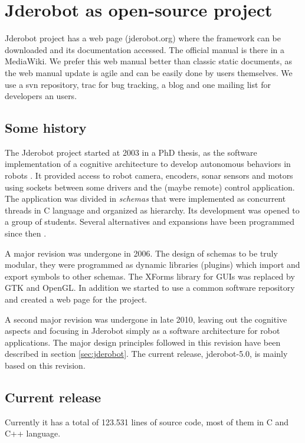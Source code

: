 \documentclass[twocolumn]{svjour3}          %
\begin{document}
\section{Jderobot as open-source project}

Jderobot project has a web page (jderobot.org) where the framework can be downloaded and its documentation accessed. The official manual is there in a MediaWiki. We prefer this web manual better than classic static documents, as the web manual update is agile and can be easily done by users themselves. We use a svn repository, trac for bug tracking, a blog and one mailing list for developers an users.

\subsection{Some history}

The Jderobot project started at 2003 in a PhD thesis, as the software implementation of a cognitive architecture to develop autonomous behaviors in robots \cite{canas02,canas05e}. It provided access to robot camera, encoders, sonar sensors and motors using sockets between some drivers and the (maybe remote) control application. The application was divided in \textit{schemas} that were implemented as concurrent threads in C language and organized as hierarchy. Its development was opened to a group of students. Several alternatives and expansions have been programmed since then \cite{canas07,canas07f}. 

A major revision was undergone in 2006. The design of schemas to be truly modular, they were programmed as dynamic libraries (plugins) which import and export symbols to other schemas. The XForms library for GUIs was replaced by GTK and OpenGL. In addition we started to use a common software repository and created a web page for the project. 

A second major revision was undergone in late 2010, leaving out the cognitive aspects and focusing in Jderobot simply as a software architecture for robot applications. The major design principles followed in this revision have been described in section \ref{sec:jderobot}. The current release, jderobot-5.0, is mainly based on this revision.

\subsection{Current release}
Currently it has a total of 123.531 lines of source code, most of them in C and C++ language.
\end{document}
